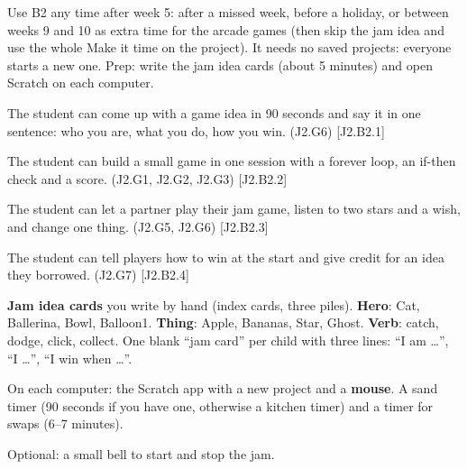 
\begin{teachernote}
Use B2 any time after week 5: after a missed week, before a holiday, or between weeks 9 and 10 as extra time for the arcade games (then skip the jam idea and use the whole Make it time on the project). It needs no saved projects: everyone starts a new one. Prep: write the jam idea cards (about 5 minutes) and open Scratch on each computer.
\end{teachernote}

\begin{objectives}
  \item The student can come up with a game idea in 90 seconds and say it in one sentence: who you are, what you do, how you win. (J2.G6) [J2.B2.1]
  \item The student can build a small game in one session with a forever loop, an if-then check and a score. (J2.G1, J2.G2, J2.G3) [J2.B2.2]
  \item The student can let a partner play their jam game, listen to two stars and a wish, and change one thing. (J2.G5, J2.G6) [J2.B2.3]
  \item The student can tell players how to win at the start and give credit for an idea they borrowed. (J2.G7) [J2.B2.4]
\end{objectives}

\begin{materials}
  \item \textbf{Jam idea cards} you write by hand (index cards, three piles). \textbf{Hero}: Cat, Ballerina, Bowl, Balloon1. \textbf{Thing}: Apple, Bananas, Star, Ghost. \textbf{Verb}: catch, dodge, click, collect. One blank \enquote{jam card} per child with three lines: \enquote{I am \ldots}, \enquote{I \ldots}, \enquote{I win when \ldots}.
  \item On each computer: the Scratch app with a new project and a \textbf{mouse}. A sand timer (90 seconds if you have one, otherwise a kitchen timer) and a timer for swaps (6--7 minutes).
  \item Optional: a small bell to start and stop the jam.
\end{materials}

